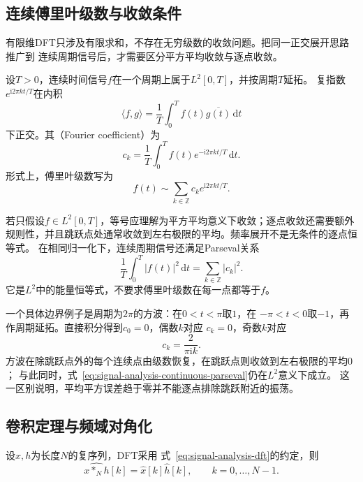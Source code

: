 \subsection{连续傅里叶级数与收敛条件}

有限维DFT只涉及有限求和，不存在无穷级数的收敛问题。把同一正交展开思路推广到
连续周期信号后，才需要区分平方平均收敛与逐点收敛。
\begin{definition}[周期信号的傅里叶系数与级数]
\label{def:signal-analysis-fourier-series}
设$T>0$，连续时间信号$f$在一个周期上属于$L^2[0,T]$，并按周期$T$延拓。
复指数$e^{\mathrm{i}2\pi kt/T}$在内积
\[
  \langle f,g\rangle
  =
  \frac{1}{T}\int_0^T f(t)\overline{g(t)}\,\mathrm{d}t
\]
下正交。其（Fourier coefficient）为
\[
  c_k=
  \frac{1}{T}\int_0^T
  f(t)e^{-\mathrm{i}2\pi kt/T}\,\mathrm{d}t.
\]
形式上，傅里叶级数写为
\begin{equation}
  f(t)\sim\sum_{k\in\mathbb{Z}}c_k
  e^{\mathrm{i}2\pi kt/T}.
  \label{eq:signal-analysis-fourier-series}
\end{equation}
\end{definition}
若只假设$f\in L^2[0,T]$，等号应理解为平方平均意义下收敛；逐点收敛还需要额外
规则性，并且跳跃点处通常收敛到左右极限的平均。频率展开不是无条件的逐点恒等式。
在相同归一化下，连续周期信号还满足Parseval关系
\begin{equation}
  \frac{1}{T}\int_0^T|f(t)|^2\,\mathrm{d}t
  =
  \sum_{k\in\mathbb{Z}}|c_k|^2.
  \label{eq:signal-analysis-continuous-parseval}
\end{equation}
它是$L^2$中的能量恒等式，不要求傅里叶级数在每一点都等于$f$。

一个具体边界例子是周期为$2\pi$的方波：在$0<t<\pi$取$1$，在
$-\pi<t<0$取$-1$，再作周期延拓。直接积分得到$c_0=0$，偶数$k$对应
$c_k=0$，奇数$k$对应
\[
  c_k=\frac{2}{\pi\mathrm{i}k}.
\]
方波在除跳跃点外的每个连续点由级数恢复，在跳跃点则收敛到左右极限的平均$0$；
与此同时，式~\eqref{eq:signal-analysis-continuous-parseval}仍在$L^2$意义下成立。
这一区别说明，平均平方误差趋于零并不能逐点排除跳跃附近的振荡。

\subsection{卷积定理与频域对角化}

\begin{theorem}[离散循环卷积定理]
\label{thm:signal-analysis-circular-convolution-theorem}
设$x,h$为长度$N$的复序列，DFT采用
式~\eqref{eq:signal-analysis-dft}的约定，则
\[
  \widehat{x*_Nh}[k]
  =
  \widehat{x}[k]\widehat{h}[k],
  \qquad k=0,\ldots,N-1.
\]
\end{theorem}

